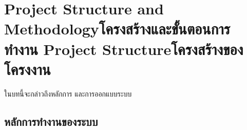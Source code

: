 \chapter{\ifproject%
      \ifenglish Project Structure and Methodology\else โครงสร้างและขั้นตอนการทำงาน\fi
  \else%
      \ifenglish Project Structure\else โครงสร้างของโครงงาน\fi
  \fi
 }

ในบทนี้จะกล่าวถึงหลักการ และการออกแบบระบบ

\makeatletter


\makeatother

\section{หลักการทำงานของระบบ}



